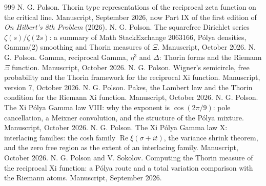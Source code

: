 \begin{thebibliography}{999}
 N. G. Polson. Thorin type representations of the reciprocal zeta function on the critical line. Manuscript, September 2026, now Part IX of the first edition of \emph{On Hilbert's 8th Problem} (2026).
 N. G. Polson. The squarefree Dirichlet series $\zeta(s)/\zeta(2s)$: a summary of Math StackExchange 2063166, P\'olya densities, Gamma(2) smoothing and Thorin measures of $\Xi$. Manuscript, October 2026.
 N. G. Polson. Gamma, reciprocal Gamma, $\eta^3$ and $\Delta$: Thorin forms and the Riemann $\Xi$ function. Manuscript, October 2026.
 N. G. Polson. Wigner's semicircle, free probability and the Thorin framework for the reciprocal Xi function. Manuscript, version 7, October 2026.
 N. G. Polson. Pakes, the Lambert law and the Thorin condition for the Riemann Xi function. Manuscript, October 2026.
 N. G. Polson. The Xi P\'olya Gamma law VIII: why the exponent is $\cos(2\pi/9)$: pole cancellation, a Meixner convolution, and the structure of the P\'olya mixture. Manuscript, October 2026.
 N. G. Polson. The Xi P\'olya Gamma law X: interlacing families: the cosh family $\operatorname{Re}\xi(\sigma+it)$, the variance shrink theorem, and the zero free region as the extent of an interlacing family. Manuscript, October 2026.
 N. G. Polson and V. Sokolov. Computing the Thorin measure of the reciprocal Xi function: a P\'olya route and a total variation comparison with the Riemann atoms. Manuscript, September 2026.

\end{thebibliography}
